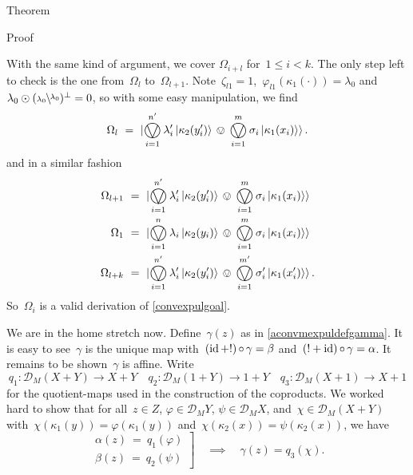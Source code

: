\documentclass[b]{subfiles}
\begin{document}
\begin{parsec}
\begin{point}{Theorem}
\begin{point}{Proof}
\begin{point}
With the same kind of argument, we cover
    $\Omega_{i+l}$ for~$1 \leq i < k$.
The only step left to check is the one
    from~$\Omega_l$ to~$\Omega_{l+1}$.
Note~$\zeta_{l1}=1$,~$\varphi_{l1}(\kappa_1(\cdot)) = \lambda_0$
and~$\lambda_0 \odot  (\rfrac{\lambda_0}{\lambda_0})^\perp = 0$,
so with some easy manipulation, we find
\begin{equation*}
    \Omega_l \ = \  \ket{
        \bigovee^{n'}_{i=1} \lambda'_i \ket{\kappa_2(y'_i)}
\, \ovee\,  \bigovee^m_{i=1} \sigma_i \ket{\kappa_1(x_i)} }.
\end{equation*}
and in a similar fashion
\begin{align*}
    \Omega_{l+1} & \ = \  \ket{
        \bigovee^{n'}_{i=1} \lambda'_i \ket{\kappa_2(y'_i)}
    \, \ovee\,  \bigovee^m_{i=1} \sigma_i \ket{\kappa_1(x_i)} } \\
    \Omega_{1} & \ = \  \ket{
        \bigovee^{n}_{i=1} \lambda_i \ket{\kappa_2(y_i)}
\,\ovee\, \bigovee^m_{i=1} \sigma_i \ket{\kappa_1(x_i)} } \\
    \Omega_{l+k} & \ = \  \ket{
        \bigovee^{n'}_{i=1} \lambda'_i \ket{\kappa_2(y'_i)}
    \,\ovee\, \bigovee^{m'}_{i=1} \sigma'_i \ket{\kappa_1(x'_i)} }.
\end{align*}
So~$\Omega_i$ is a valid derivation of \eqref{convexpulgoal}.
\end{point}
\begin{point}%
We are in the home stretch now.
Define~$\gamma(z)$ as in \eqref{aconvmexpuldefgamma}.
It is easy to see~$\gamma$
    is the unique map with~$(\operatorname{id}+!) \mathop{\circ} \gamma = \beta$
    and~$(!+\operatorname{id})\mathop{\circ} \gamma = \alpha$.
It remains to be shown~$\gamma$ is affine.
Write
\begin{equation*}
q_1\colon \mathcal{D}_M(X+Y) \to X+Y \quad
q_2\colon \mathcal{D}_M(1+Y) \to 1+Y \quad
q_3\colon \mathcal{D}_M(X+1) \to X+1
\end{equation*}
for the quotient-maps used in the construction of the coproducts.
We worked hard to show
that
for all~$z \in Z$, $\varphi \in \mathcal{D}_M Y$,
$\psi \in \mathcal{D}_M X$, 
and~$\chi \in \mathcal{D}_M (X+Y)$
with~$\chi(\kappa_1 (y)) = \varphi(\kappa_1(y))$
and~$\chi(\kappa_2 (x)) = \psi(\kappa_2(x))$,
we have
\begin{equation*}
    \left.\begin{array}{ll}
    \alpha(z)\ =\ q_1(\varphi) \\
    \beta(z)\ =\ q_2(\psi)
    \end{array}\right] \quad \implies \quad
    \gamma(z) = q_3(\chi).
\end{equation*}

\end{point}
\end{point}
\end{point}
\end{parsec}
\end{document}
